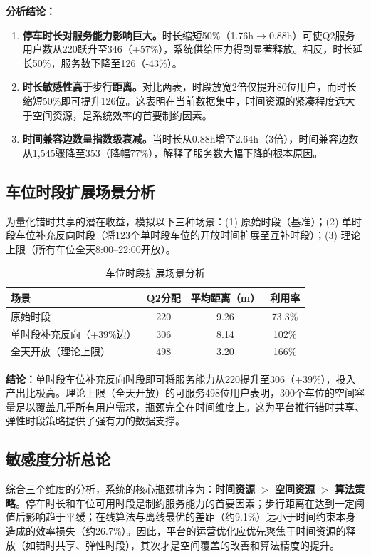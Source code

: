 \documentclass[12pt,a4paper]{ctexart}
\begin{document}
\textbf{分析结论：}
\begin{enumerate}
  \item \textbf{停车时长对服务能力影响巨大。}时长缩短50\%（1.76h$\to$0.88h）可使Q2服务用户数从220跃升至346（+57\%），系统供给压力得到显著释放。相反，时长延长50\%，服务数下降至126（-43\%）。
  \item \textbf{时长敏感性高于步行距离。}对比两表，时段放宽2倍仅提升80位用户，而时长缩短50\%即可提升126位。这表明在当前数据集中，时间资源的紧凑程度远大于空间资源，是系统效率的首要制约因素。
  \item \textbf{时间兼容边数呈指数级衰减。}当时长从0.88h增至2.64h（3倍），时间兼容边数从1,545骤降至353（降幅77\%），解释了服务数大幅下降的根本原因。
\end{enumerate}

\subsection{车位时段扩展场景分析}

为量化错时共享的潜在收益，模拟以下三种场景：(1) 原始时段（基准）；(2) 单时段车位补充反向时段（将123个单时段车位的开放时间扩展至互补时段）；(3) 理论上限（所有车位全天8:00--22:00开放）。

\begin{table}[H]
  \centering
  \caption{车位时段扩展场景分析}
  \label{tab:sens-expand}
  \begin{tabular}{lccc}
    \toprule
    场景 & Q2分配 & 平均距离（m） & 利用率 \\
    \midrule
    原始时段 & 220 & 9.26 & 73.3\% \\
    单时段补充反向（+39\%边） & 306 & 8.14 & 102\% \\
    全天开放（理论上限） & 498 & 3.20 & 166\% \\
    \bottomrule
  \end{tabular}
\end{table}

\textbf{结论：}单时段车位补充反向时段即可将服务能力从220提升至306（+39\%），投入产出比极高。理论上限（全天开放）的可服务498位用户表明，300个车位的空间容量足以覆盖几乎所有用户需求，瓶颈完全在时间维度上。这为平台推行错时共享、弹性时段策略提供了强有力的数据支撑。

\subsection{敏感度分析总论}

综合三个维度的分析，系统的核心瓶颈排序为：\textbf{时间资源} $>$ \textbf{空间资源} $>$ \textbf{算法策略}。停车时长和车位可用时段是制约服务能力的首要因素；步行距离在达到一定阈值后影响趋于平缓；在线算法与离线最优的差距（约9.1\%）远小于时间约束本身造成的效率损失（约26.7\%）。因此，平台的运营优化应优先聚焦于时间资源的释放（如错时共享、弹性时段），其次才是空间覆盖的改善和算法精度的提升\cite{jian2019smart}。
\end{document}
